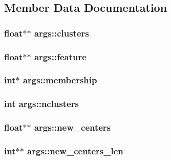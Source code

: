 \subsection{Member Data Documentation}
\hypertarget{structargs_ac4305f4e6d9a31ad09cd2b2446113312}{
\subsubsection[{clusters}]{\setlength{\rightskip}{0pt plus 5cm}float$\ast$$\ast$ args\-::clusters}}\label{structargs_ac4305f4e6d9a31ad09cd2b2446113312}
\hypertarget{structargs_a1d7a017444ee5b0780b67854c23759d2}{
\subsubsection[{feature}]{\setlength{\rightskip}{0pt plus 5cm}float$\ast$$\ast$ args\-::feature}}\label{structargs_a1d7a017444ee5b0780b67854c23759d2}
\hypertarget{structargs_a347f2dfe89ab2b63543461552ccaa016}{
\subsubsection[{membership}]{\setlength{\rightskip}{0pt plus 5cm}int$\ast$ args\-::membership}}\label{structargs_a347f2dfe89ab2b63543461552ccaa016}
\hypertarget{structargs_a0b3b50a055e6266c75b78c4298b0eb1c}{
\subsubsection[{nclusters}]{\setlength{\rightskip}{0pt plus 5cm}int args\-::nclusters}}\label{structargs_a0b3b50a055e6266c75b78c4298b0eb1c}
\hypertarget{structargs_a8cadab02e92b297690495ed58d5bcaec}{
\subsubsection[{new\-\_\-centers}]{\setlength{\rightskip}{0pt plus 5cm}float$\ast$$\ast$ args\-::new\-\_\-centers}}\label{structargs_a8cadab02e92b297690495ed58d5bcaec}
\hypertarget{structargs_a70fce814f4b524a2be8ce6110aea167a}{
\subsubsection[{new\-\_\-centers\-\_\-len}]{\setlength{\rightskip}{0pt plus 5cm}int$\ast$$\ast$ args\-::new\-\_\-centers\-\_\-len}}\label{structargs_a70fce814f4b524a2be8ce6110aea167a}
